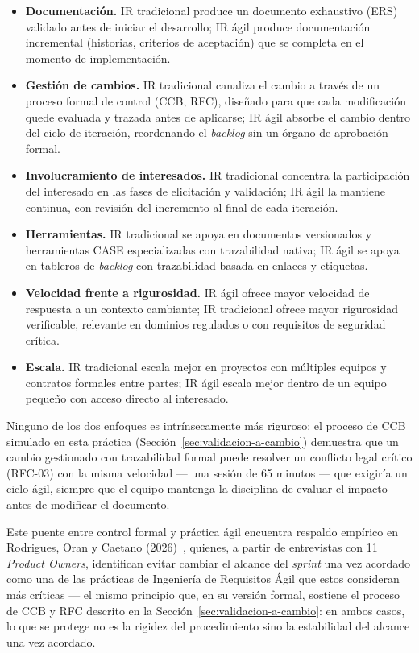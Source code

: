 \documentclass[journal,onecolumn]{IEEEtran}
\begin{document}
	\begin{itemize}
		\item \textbf{Documentación.} IR tradicional produce un
		documento exhaustivo (ERS) validado antes de iniciar el
		desarrollo; IR ágil produce documentación incremental
		(historias, criterios de aceptación) que se completa en el
		momento de implementación.
		\item \textbf{Gestión de cambios.} IR tradicional canaliza el
		cambio a través de un proceso formal de control (CCB, RFC),
		diseñado para que cada modificación quede evaluada y trazada
		antes de aplicarse; IR ágil absorbe el cambio dentro del ciclo
		de iteración, reordenando el \emph{backlog} sin un órgano de
		aprobación formal.
		\item \textbf{Involucramiento de interesados.} IR tradicional
		concentra la participación del interesado en las fases de
		elicitación y validación; IR ágil la mantiene continua, con
		revisión del incremento al final de cada iteración.
		\item \textbf{Herramientas.} IR tradicional se apoya en
		documentos versionados y herramientas CASE especializadas con
		trazabilidad nativa; IR ágil se apoya en tableros de
		\emph{backlog} con trazabilidad basada en enlaces y etiquetas.
		\item \textbf{Velocidad frente a rigurosidad.} IR ágil ofrece
		mayor velocidad de respuesta a un contexto cambiante; IR
		tradicional ofrece mayor rigurosidad verificable, relevante en
		dominios regulados o con requisitos de seguridad crítica.
		\item \textbf{Escala.} IR tradicional escala mejor en
		proyectos con múltiples equipos y contratos formales entre
		partes; IR ágil escala mejor dentro de un equipo pequeño con
		acceso directo al interesado.
	\end{itemize}
	
	Ninguno de los dos enfoques es intrínsecamente más riguroso: el
	proceso de CCB simulado en esta práctica
	(Sección~\ref{sec:validacion-a-cambio}) demuestra que un cambio
	gestionado con trazabilidad formal puede resolver un conflicto
	legal crítico (RFC-03) con la misma velocidad --- una sesión de 65
	minutos --- que exigiría un ciclo ágil, siempre que el equipo
	mantenga la disciplina de evaluar el impacto antes de modificar el
	documento.
	
	Este puente entre control formal y práctica ágil encuentra
	respaldo empírico en Rodrigues, Oran y Caetano
	(2026)~\cite{rodrigues2026}, quienes, a partir de entrevistas con
	11 \emph{Product Owners}, identifican evitar cambiar el alcance
	del \emph{sprint} una vez acordado como una de las prácticas de
	Ingeniería de Requisitos Ágil que estos consideran más críticas ---
	el mismo principio que, en su versión formal, sostiene el proceso
	de CCB y RFC descrito en la Sección~\ref{sec:validacion-a-cambio}:
	en ambos casos, lo que se protege no es la rigidez del
	procedimiento sino la estabilidad del alcance una vez acordado.
	
\end{document}
